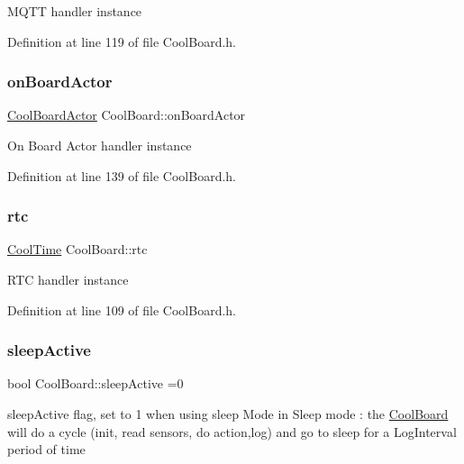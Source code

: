 M\+Q\+TT handler instance 

Definition at line 119 of file Cool\+Board.\+h.

\mbox{\label{class_cool_board_a4ac693895c21025b8808653f2a4316e6}} 
\subsubsection{\texorpdfstring{on\+Board\+Actor}{onBoardActor}}
{\footnotesize\ttfamily \hyperlink{class_cool_board_actor}{Cool\+Board\+Actor} Cool\+Board\+::on\+Board\+Actor\hspace{0.3cm}{\ttfamily [private]}}

On Board Actor handler instance 

Definition at line 139 of file Cool\+Board.\+h.

\mbox{\label{class_cool_board_a50d2a6716879d64a85f3c6b44ad63275}} 
\subsubsection{\texorpdfstring{rtc}{rtc}}
{\footnotesize\ttfamily \hyperlink{class_cool_time}{Cool\+Time} Cool\+Board\+::rtc\hspace{0.3cm}{\ttfamily [private]}}

R\+TC handler instance 

Definition at line 109 of file Cool\+Board.\+h.

\mbox{\label{class_cool_board_a0a51b2287139f66c738101fb53139230}} 
\subsubsection{\texorpdfstring{sleep\+Active}{sleepActive}}
{\footnotesize\ttfamily bool Cool\+Board\+::sleep\+Active =0\hspace{0.3cm}{\ttfamily [private]}}

sleep\+Active flag, set to 1 when using sleep Mode in Sleep mode \+: the \hyperlink{class_cool_board}{Cool\+Board} will do a cycle (init, read sensors, do action,log) and go to sleep for a Log\+Interval period of time 

